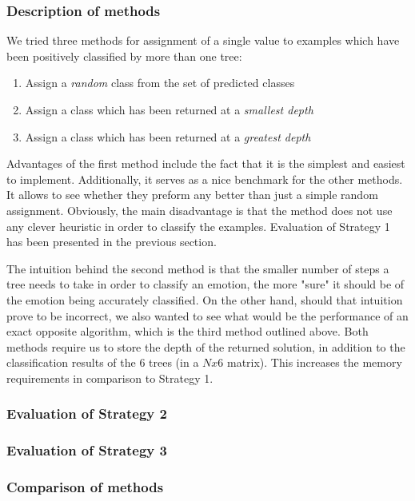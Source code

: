 \documentclass[a4paper]{article}
\begin{document}
\subsubsection{Description of methods}

We tried three methods for assignment of a single value to examples which have been positively classified by more than one tree:
\begin{enumerate} \itemsep0pt \parskip0pt 
  \item Assign a \emph{random} class from the set of predicted classes
  \item Assign a class which has been returned at a \emph{smallest depth}
  \item Assign a class which has been returned at a \emph{greatest depth}
\end{enumerate}
Advantages of the first method include the fact that it is the simplest and easiest to implement. Additionally, it serves as a nice benchmark for the other methods. It allows to see whether they preform any better than just a simple random assignment. Obviously, the main disadvantage is that the method does not use any clever heuristic in order to classify the examples. Evaluation of Strategy 1 has been presented in the previous section. \smallskip

The intuition behind the second method is that the smaller number of steps a tree needs to take in order to classify an emotion, the more "sure" it should be of the emotion being accurately classified. On the other hand, should that intuition prove to be incorrect, we also wanted to see what would be the performance of an exact opposite algorithm, which is the third method outlined above. Both methods require us to store the depth of the returned solution, in addition to the classification results of the 6 trees (in a $Nx6$ matrix). This increases the memory requirements in comparison to Strategy 1.

\subsubsection{Evaluation of Strategy 2}



\subsubsection{Evaluation of Strategy 3}



\subsubsection{Comparison of methods}
\end{document}
